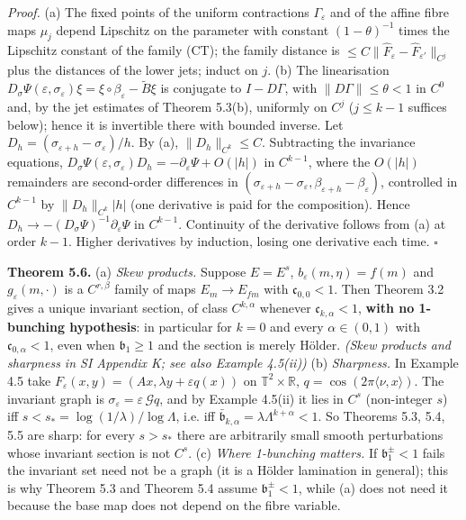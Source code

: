 \documentclass[11pt,a4paper]{article}
\theoremstyle{plain}
\theoremstyle{definition}
\theoremstyle{remark}
\numberwithin{equation}{section}
\numberwithin{figure}{section}
\begin{document}
\textit{Proof.} (a) The fixed points of the uniform contractions $\Gamma_\varepsilon$ and of the affine fibre maps $\mu_j$ depend Lipschitz on the parameter with constant $(1-\theta)^{-1}$ times the Lipschitz constant of the family (CT); the family distance is $\le C\|\widehat F_\varepsilon-\widehat F_{\varepsilon'}\|_{C^j}$ plus the distances of the lower jets; induct on $j$.
(b) The linearisation $D_\sigma\Psi(\varepsilon,\sigma_\varepsilon)\xi=\xi\circ\beta_\varepsilon-\tilde B\xi$ is conjugate to $I-D\Gamma$, with $\|D\Gamma\|\le\theta<1$ in $C^0$ and, by the jet estimates of Theorem 5.3(b), uniformly on $C^j$ ($j\le k-1$ suffices below); hence it is invertible there with bounded inverse. Let $D_h=(\sigma_{\varepsilon+h}-\sigma_\varepsilon)/h$. By (a), $\|D_h\|_{C^k}\le C$. Subtracting the invariance equations, $D_\sigma\Psi(\varepsilon,\sigma_\varepsilon)D_h=-\partial_\varepsilon\Psi+O(|h|)$ in $C^{k-1}$, where the $O(|h|)$ remainders are second-order differences in $(\sigma_{\varepsilon+h}-\sigma_\varepsilon,\beta_{\varepsilon+h}-\beta_\varepsilon)$, controlled in $C^{k-1}$ by $\|D_h\|_{C^k}|h|$ (one derivative is paid for the composition). Hence $D_h\to-(D_\sigma\Psi)^{-1}\partial_\varepsilon\Psi$ in $C^{k-1}$. Continuity of the derivative follows from (a) at order $k-1$. Higher derivatives by induction, losing one derivative each time. $\square$

\textbf{Theorem 5.6.} (a) \textit{Skew products.} Suppose $E=E^s$, $b_\varepsilon(m,\eta)=f(m)$ and $g_\varepsilon(m,\cdot)$ is a $C^{r,\beta}$ family of maps $E_{m}\to E_{fm}$ with $\mathfrak c_{0,0}<1$. Then Theorem 3.2 gives a unique invariant section, of class $C^{k,\alpha}$ whenever $\mathfrak c_{k,\alpha}<1$, \textbf{with no 1-bunching hypothesis}: in particular for $k=0$ and every $\alpha\in(0,1)$ with $\mathfrak c_{0,\alpha}<1$, even when $\mathfrak b_1\ge1$ and the section is merely Hölder. \textit{(Skew products and sharpness in SI Appendix K; see also Example 4.5(ii))}
(b) \textit{Sharpness.} In Example 4.5 take $F_\varepsilon(x,y)=(Ax,\lambda y+\varepsilon q(x))$ on $\mathbb T^2\times\mathbb R$, $q=\cos(2\pi\langle\nu,x\rangle)$. The invariant graph is $\sigma_\varepsilon=\varepsilon\,\mathcal Gq$, and by Example 4.5(ii) it lies in $C^s$ (non-integer $s$) iff $s<s_*=\log(1/\lambda)/\log\Lambda$, i.e. iff $\bar{\mathfrak b}_{k,\alpha}=\lambda\Lambda^{k+\alpha}<1$. So Theorems 5.3, 5.4, 5.5 are sharp: for every $s>s_*$ there are arbitrarily small smooth perturbations whose invariant section is not $C^s$.
(c) \textit{Where 1-bunching matters.} If $\mathfrak b_1^\pm<1$ fails the invariant set need not be a graph (it is a Hölder lamination in general); this is why Theorem 5.3 and Theorem 5.4 assume $\mathfrak b_1^\pm<1$, while (a) does not need it because the base map does not depend on the fibre variable.
\end{document}
